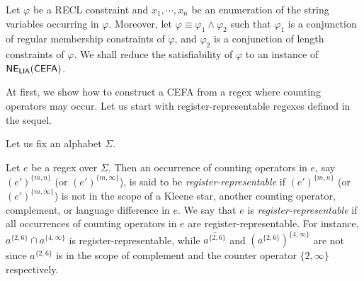 Let $\varphi$ be a RECL constraint and $x_1, \cdots, x_n$ be an enumeration of the string variables occurring in $\varphi$. Moreover, let $\varphi \equiv \varphi_1 \wedge \varphi_2$ such that $\varphi_1$ is a conjunction of regular membership constraints of $\varphi$, and $\varphi_2$ is a conjunction of length constraints of $\varphi$.
We shall reduce the satisfiability of $\varphi$ to an instance of ${\sf NE_{LIA}(CEFA)}$. 

At first, we show how to construct a CEFA from a regex where counting operators may occur. 
Let us start with register-representable regexes defined in the sequel. 

Let us fix an alphabet $\Sigma$.

Let $e$ be a regex over $\Sigma$. Then an occurrence of counting operators in $e$, say $(e')^{\{m,n\}}$ (or $(e')^{\{m, \infty\}}$), is said to be \emph{register-representable} if $(e')^{\{m,n\}}$ (or $(e')^{\{m, \infty\}}$) is not in the scope of a Kleene star, another counting operator, complement, or language difference in $e$. We say that $e$ is \emph{register-representable} if all occurrences of counting operators in $e$ are register-representable. For instance, $a^{\{2, 6\}} \cap a^{\{4, \infty\}}$ is register-representable, while $\overline{a^{\{2, 6\}}}$ and $(a^{\{2, 6\}})^{\{4,\infty\}}$ are not since $a^{\{2,6\}}$ is in the scope of complement and the counter operator $\{2, \infty\}$ respectively.  

